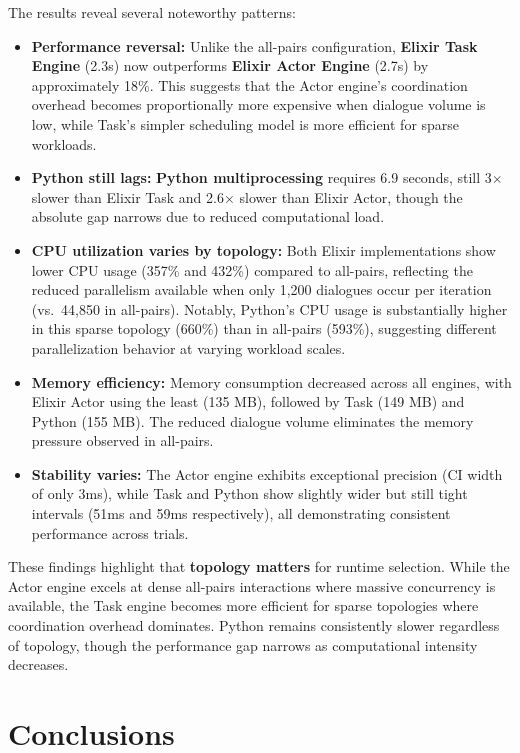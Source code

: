 \documentclass[
]{ceurart}
\begin{document}
The results reveal several noteworthy patterns:
\begin{itemize}
	\item \textbf{Performance reversal:} Unlike the all-pairs configuration, \textbf{Elixir Task Engine} (2.3s) now outperforms \textbf{Elixir Actor Engine} (2.7s) by approximately 18\%. This suggests that the Actor engine's coordination overhead becomes proportionally more expensive when dialogue volume is low, while Task's simpler scheduling model is more efficient for sparse workloads.
	\item \textbf{Python still lags:} \textbf{Python multiprocessing} requires 6.9 seconds, still 3$\times$ slower than Elixir Task and 2.6$\times$ slower than Elixir Actor, though the absolute gap narrows due to reduced computational load.
	\item \textbf{CPU utilization varies by topology:} Both Elixir implementations show lower CPU usage (357\% and 432\%) compared to all-pairs, reflecting the reduced parallelism available when only 1,200 dialogues occur per iteration (vs.\ 44,850 in all-pairs). Notably, Python's CPU usage is substantially higher in this sparse topology (660\%) than in all-pairs (593\%), suggesting different parallelization behavior at varying workload scales.
	\item \textbf{Memory efficiency:} Memory consumption decreased across all engines, with Elixir Actor using the least (135 MB), followed by Task (149 MB) and Python (155 MB). The reduced dialogue volume eliminates the memory pressure observed in all-pairs.
	\item \textbf{Stability varies:} The Actor engine exhibits exceptional precision (CI width of only 3ms), while Task and Python show slightly wider but still tight intervals (51ms and 59ms respectively), all demonstrating consistent performance across trials.
\end{itemize}These findings highlight that \textbf{topology matters} for runtime selection. While the Actor engine excels at dense all-pairs interactions where massive concurrency is available, the Task engine becomes more efficient for sparse topologies where coordination overhead dominates. Python remains consistently slower regardless of topology, though the performance gap narrows as computational intensity decreases.


\section{Conclusions}
\end{document}
